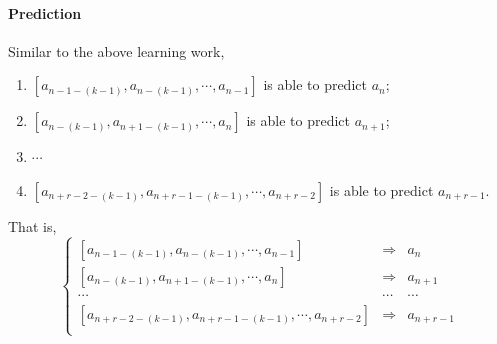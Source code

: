 \documentclass[a0b,portrait]{a0poster}
\begin{document}
\begin{multicols}{3}
\paragraph*{Prediction}
Similar to the above learning work,
\begin{enumerate}
\item $\left[a_{n - 1 - \left(k - 1\right)}, a_{n - \left(k - 1\right)}, \cdots, a_{n - 1}\right]$ is able to predict $a_{n}$;
\item $\left[a_{n - \left(k - 1\right)}, a_{n + 1 - \left(k - 1\right)}, \cdots, a_{n}\right]$ is able to predict $a_{n + 1}$;
\item $\cdots$
\item $\left[a_{n + r - 2 - \left(k - 1\right)}, a_{n + r - 1 - \left(k - 1\right)}, \cdots, a_{n + r - 2}\right]$ is able to predict $a_{n + r - 1}$.
\end{enumerate}
That is,
\begin{equation}
\left\{
\begin{array}{rcl}
\left[a_{n - 1 - \left(k - 1\right)}, a_{n - \left(k - 1\right)}, \cdots, a_{n - 1}\right] & \Rightarrow & a_{n}\\
\left[a_{n - \left(k - 1\right)}, a_{n + 1 - \left(k - 1\right)}, \cdots, a_{n}\right] & \Rightarrow & a_{n + 1}\\
\cdots & \cdots & \cdots \\
\left[a_{n + r - 2 - \left(k - 1\right)}, a_{n + r - 1 - \left(k - 1\right)}, \cdots, a_{n + r - 2}\right] & \Rightarrow & a_{n + r - 1} \\
\end{array}
\right.
\end{equation}

\end{multicols}
\end{document}
